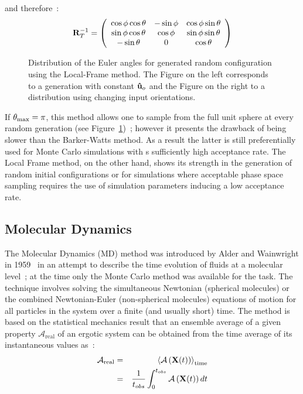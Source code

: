 and therefore~:
\begin{equation}
\mathbf{R}^{-1}_T = \left(
\begin{array}{ccc}
\cos\phi\cos\theta	&-\sin\phi	&\cos\phi\sin\theta	\\
\sin\phi\cos\theta	&\cos\phi	&\sin\phi\sin\theta		\\
-\sin\theta		&0		&\cos\theta
\end{array}
\right)
\end{equation}

\begin{figure}
	\centering
	\caption{Distribution of the Euler angles for generated random configuration using the
	Local-Frame method. The Figure on the left corresponds to a generation with constant 
	$\mathbf{\hat{u} }_o$ and the Figure on the right to a distribution using changing input orientations.}
	\label{fig:LFdistro}
\end{figure}


If $\theta_{\mathrm{max}} =\pi$, this method allows one to sample from the full unit sphere at every random
generation (see Figure~\ref{fig:LFdistro})~; however it presents the drawback of being slower
than the Barker-Watts method. As a
result the latter is still preferentially used for Monte Carlo simulations with s sufficiently
high acceptance rate. The Local Frame method, on the other hand, shows its strength 
in the generation of random initial configurations or for simulations where acceptable phase 
space sampling requires the use of simulation parameters inducing a low acceptance rate.


\subsection{Molecular Dynamics}

The Molecular Dynamics (MD) method was introduced by Alder and Wainwright in
1959~\cite{AlderWainwright59} in an attempt to describe the time evolution of fluids at a
molecular level~; at the time only the Monte Carlo method was
available for the task. The technique involves solving the simultaneous Newtonian
(spherical molecules) or the combined Newtonian-Euler (non-spherical molecules) equations of
motion for all particles in the system over a finite (and usually short) time. The method is
based on the statistical mechanics result that an ensemble average of a given property
$\mathcal{A}_\mathrm{real}$ of an ergotic system can be obtained from the time average of 
its instantaneous values as~:
%
\begin{eqnarray}
        \mathcal{A}_\mathrm{real} &=& \left<  \mathcal{A}\left(\mathbf{X}(t)\right) \right>_{\mathrm{time}} \nonumber \\
                                &=& \frac{1}{t_{obs}}\int^{t_{obs}}_{0}
\mathcal{A}\left(\mathbf{X}(t)\right) dt \end{eqnarray}

